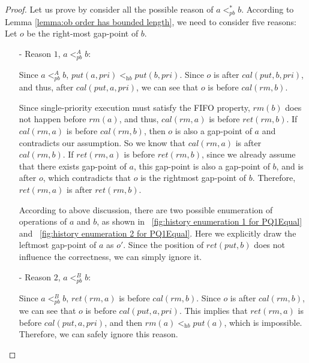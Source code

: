 \begin {proof}

Let us prove by consider all the possible reason of $a <_{\textit{pb}}^* b$. According to Lemma \ref{lemma:ob order has bounded length}, we need to consider five reasons: Let $o$ be the right-most gap-point of $b$.

\begin{itemize}
\setlength{\itemsep}{0.5pt}
\item[-] Reason $1$, $a <_{\textit{pb}}^A b$:

    Since $a <_{\textit{pb}}^A b$, $\textit{put}(a,\textit{pri}) <_{\textit{hb}} \textit{put}(b,\textit{pri})$. Since $o$ is after $\textit{cal}(\textit{put},b,\textit{pri})$, and thus, after $\textit{cal}(\textit{put},a,\textit{pri})$, we can see that $o$ is before $\textit{cal}(\textit{rm},b)$.

    Since single-priority execution must satisfy the FIFO property, $\textit{rm}(b)$ does not happen before $\textit{rm}(a)$, and thus, $\textit{cal}(\textit{rm},a)$ is before $\textit{ret}(\textit{rm},b)$. If $\textit{cal}(\textit{rm},a)$ is before $\textit{cal}(\textit{rm},b)$, then $o$ is also a gap-point of $a$ and contradicts our assumption. So we know that $\textit{cal}(\textit{rm},a)$ is after $\textit{cal}(\textit{rm},b)$. If $\textit{ret}(\textit{rm},a)$ is before $\textit{ret}(\textit{rm},b)$, since we already assume that there exists gap-point of $a$, this gap-point is also a gap-point of $b$, and is after $o$, which contradicts that $o$ is the rightmost gap-point of $b$. Therefore, $\textit{ret}(\textit{rm},a)$ is after $\textit{ret}(\textit{rm},b)$.

    According to above discussion, there are two possible enumeration of operations of $a$ and $b$, as shown in \figurename~\ref{fig:history enumeration 1 for PQ1Equal} and \figurename~\ref{fig:history enumeration 2 for PQ1Equal}. Here we explicitly draw the leftmost gap-point of $a$ as $o'$. Since the position of $\textit{ret}(\textit{put},b)$ does not influence the correctness, we can simply ignore it.

\item[-] Reason $2$, $a <_{\textit{pb}}^B b$:

    Since $a <_{\textit{pb}}^B b$, $\textit{ret}(\textit{rm},a)$ is before $\textit{cal}(\textit{rm},b)$. Since $o$ is after $\textit{cal}(\textit{rm},b)$, we can see that $o$ is before $\textit{cal}(\textit{put},a,\textit{pri})$. This implies that $\textit{ret}(\textit{rm},a)$ is before $\textit{cal}(\textit{put},a,\textit{pri})$, and then $\textit{rm}(a) <_{\textit{hb}} \textit{put}(a)$, which is impossible. Therefore, we can safely ignore this reason.


\end{itemize}
\end{proof}
